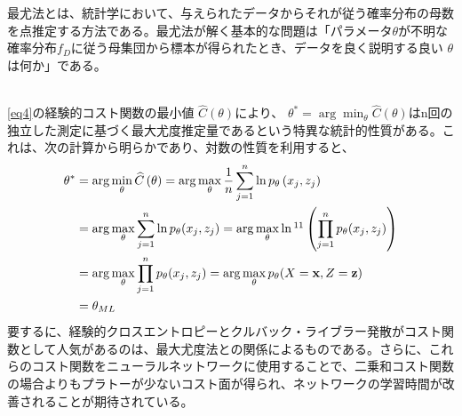 \documentclass[a4paper]{jsarticle}%
\begin{document}
\begin{dfn}\label{def:MLE}
  最尤法とは、統計学において、与えられたデータからそれが従う確率分布の母数を点推定する方法である。最尤法が解く基本的な問題は「パラメータ$\displaystyle \theta$が不明な確率分布$\displaystyle f_{D}$に従う母集団から標本が得られたとき、データを良く説明する良い $\displaystyle \theta$は何か」である。
\end{dfn}
\, \\
\eqref{eq4}の経験的コスト関数の最小値 $ \widehat{C} \left(\theta\right) $により、 $ \theta^* = \arg\min_{\theta} \widehat{C} \left(\theta\right) $はn回の独立した測定に基づく最大尤度推定量であるという特異な統計的性質がある。これは、次の計算から明らかであり、対数の性質を利用すると、
\begin{align}
  \theta^* &= \arg\min_\theta \widehat{C} \left(\theta\right) = \arg\max_\theta \dfrac{1}{n}\sum_{j=1}^{n} \ln p_{\theta} \left(x_j,z_j\right) \notag\\
  &= \arg \max_{\theta} \sum_{j=1}^{n} \ln p_\theta(x_j, z_j) = \arg \max_{\theta} \ln \footnotemark[11]\left( \prod_{j=1}^{n} p_\theta(x_j,z_j) \right) \notag\\
  &= \arg \max_{\theta} \prod_{j=1}^{n} p_\theta(x_j, z_j) = \arg \max_{\theta} p_\theta(X = \mathbf{x}, Z = \mathbf{z})\notag\\
  &= \theta_{ML}\notag
\end{align}
要するに、経験的クロスエントロピーとクルバック・ライブラー発散がコスト関数として人気があるのは、最大尤度法との関係によるものである。さらに、これらのコスト関数をニューラルネットワークに使用することで、二乗和コスト関数の場合よりもプラトーが少ないコスト面が得られ、ネットワークの学習時間が改善されることが期待されている。
\end{document}
